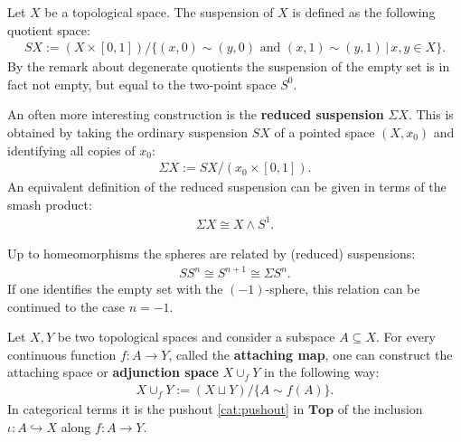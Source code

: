     \begin{construct}[Suspension]\label{topology:suspension}
        Let $X$ be a topological space. The suspension of $X$ is defined as the following quotient space:
        \begin{gather}
            SX := (X\times [0,1])/\big\{(x,0)\sim (y,0)\text{ and }(x,1)\sim (y,1)\,\big\vert\,x,y\in X\big\}.
        \end{gather}
        By the remark about degenerate quotients the suspension of the empty set is in fact not empty, but equal to the two-point space $S^0$.

        An often more interesting construction is the \textbf{reduced suspension} $\Sigma X$. This is obtained by taking the ordinary suspension $SX$ of a pointed space $(X,x_0)$ and identifying all copies of $x_0$:
        \begin{gather}
            \Sigma X := SX/(x_0\times[0,1]).
        \end{gather}
        An equivalent definition of the reduced suspension can be given in terms of the smash product:
        \begin{gather}
            \Sigma X\cong X\wedge S^1.
        \end{gather}
    \end{construct}
    \begin{example}[Spheres]\label{topology:sphere_suspension}
        Up to homeomorphisms the spheres are related by (reduced) suspensions:
        \begin{gather}
            SS^n\cong S^{n+1}\cong\Sigma S^n.
        \end{gather}
        If one identifies the empty set with the $(-1)$-sphere, this relation can be continued to the case $n=-1$.
    \end{example}

    \begin{construct}\label{topology:attaching_space}
        Let $X,Y$ be two topological spaces and consider a subspace $A\subseteq X$. For every continuous function $f:A\rightarrow Y$, called the \textbf{attaching map}, one can construct the attaching space or \textbf{adjunction space} $X\cup_f Y$ in the following way:
        \begin{gather}
            X\cup_f Y := (X\sqcup Y)/\{A\sim f(A)\}.
        \end{gather}
        In categorical terms it is the pushout \ref{cat:pushout} in $\mathbf{Top}$ of the inclusion $\iota:A\hookrightarrow X$ along $f:A\rightarrow Y$.
    \end{construct}

